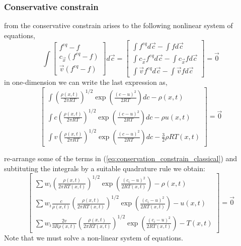 \begin{frame}
	\frametitle{Conservative constrain}
	from the conservative constrain arises to the following nonlinear system of equations,
	\begin{equation}
		\int 
			\begin{bmatrix}
			f^{eq}-f\\ 
			c_\vec{x}(f^{eq}-f)\\ 
			\vec{v}(f^{eq}-f)
			\end{bmatrix}d\vec{c} 
			=
			\begin{bmatrix}
			\int f^{eq} d\vec{c} - \int f d\vec{c}\\ 
			\int c_\vec{x} f^{eq} d\vec{c} - \int c_\vec{x} f d\vec{c}\\ 
			\int \vec{v} f^{eq} d\vec{c} - \int \vec{v} f d\vec{c}
			\end{bmatrix}
			= \vec{0}
	\end{equation}
	in one-dimension we can write the last expression as, 
	\begin{equation}
			\begin{bmatrix}
			\int \left(\frac{\rho(x,t)}{2 \pi RT}\right)^{1/2} \exp \left(\frac{(c-u)^2}{2RT} \right) dc - \rho(x,t) \\
			\int c \left(\frac{\rho(x,t)}{2 \pi RT}\right)^{1/2} \exp \left(\frac{(c-u)^2}{2RT} \right) dc - \rho u(x,t) \\
			\int v \left(\frac{\rho(x,t)}{2 \pi RT}\right)^{1/2} \exp \left(\frac{(c-u)^2}{2RT} \right) dc - \frac{3}{2} \rho RT(x,t)
			\end{bmatrix} 
			=\vec{0} 
	\label{eq:conservation_constrain_classical}
	\end{equation}
\end{frame}

\begin{frame}
	re-arrange some of the terms in (\ref{eq:conservation_constrain_classical}) and subtituting the integrals by a suitable quadrature rule we obtain:
	\begin{equation}
			\begin{bmatrix}
			\sum w_i \left(\frac{\rho(x,t)}{2 \pi RT(x,t)}\right)^{1/2} \exp \left(\frac{(c_i-u)^2}{2RT(x,t)} \right) - \rho(x,t) \\
			\sum w_i \frac{c}{\rho(x,t)} \left(\frac{\rho(x,t)}{2 \pi RT(x,t)}\right)^{1/2} \exp \left(\frac{(c_i-u)^2}{2RT(x,t)} \right) - u(x,t) \\
			\sum w_i \frac{2v}{3R\rho(x,t)} \left(\frac{\rho(x,t)}{2 \pi RT(x,t)}\right)^{1/2} \exp \left(\frac{(c_i-u)^2}{2RT(x,t)} \right) - T(x,t)
			\end{bmatrix} 
			=\vec{0} 
			\label{eq:conservation_constrain_classical_explicit}
	\end{equation}
	Note that we must solve a non-linear system of equations.
\end{frame}

